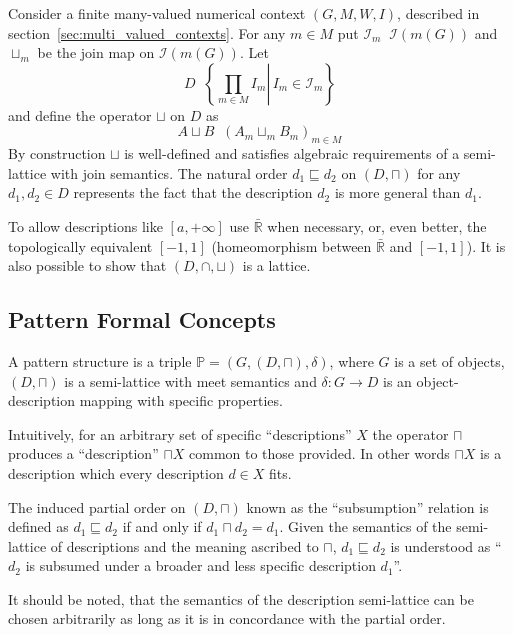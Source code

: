 \documentclass[a4paper]{article}
\newcommand{\obj}[1]{{\left\{ #1 \right \}}}
\newcommand{\clo}[1]{{\left [ #1 \right ]}}
\newcommand{\brac}[1]{{\left ( #1 \right )}}
\newcommand{\induc}[1]{{\left . #1 \right \vert}}
\newcommand{\Real}{\mathbb{R}}
\newcommand{\Ical}{\mathcal{I}}
\newcommand{\Pat}{\mathbb{P}}
\newcommand{\defn}{\mathop{\overset{\Delta}{=}}\nolimits}
\begin{document}
Consider a finite many-valued numerical context $\brac{G,M,W,I}$, described in section~\ref{sec:multi_valued_contexts}. For any $m\in M$ put $\Ical_m \defn \Ical\brac{m(G)}$ and $\sqcup_m$ be the join map on $\Ical\brac{m(G)}$. Let \[D\defn \obj{\induc{\prod_{m\in M} I_m}\, I_m\in \mathcal{I}_m}\] and define the operator $\sqcup$ on $D$ as \[ A\sqcup B \defn \brac{A_m\sqcup_m B_m}_{m\in M}\] By construction $\sqcup$ is well-defined and satisfies algebraic requirements of a semi-lattice with join semantics. The natural order $d_1\sqsubseteq d_2$ on $(D,\sqcap)$ for any $d_1, d_2\in D$ represents the fact that the description $d_2$ is more general than $d_1$.

To allow descriptions like $\clo{a, +\infty}$ use $\bar{\Real}$ when necessary, or, even better, the topologically equivalent $\clo{-1,1}$ (homeomorphism between $\bar{\Real}$ and $\clo{-1,1}$). It is also possible to show that $(D,\cap,\sqcup)$ is a lattice.



\subsection{Pattern Formal Concepts} %
\label{sub:pattern_formal_concepts}

A pattern structure is a triple $\Pat = \brac{G,(D,\sqcap), \delta}$, where $G$ is a set of objects, $(D, \sqcap)$ is a semi-lattice with meet semantics and $\delta: G\to D$ is an object-description mapping with specific properties.

Intuitively, for an arbitrary set of specific ``descriptions'' $X$ the operator $\sqcap$ produces a ``description'' $\sqcap X$ common to those provided. In other words $\sqcap X$ is a description which every description $d\in X$ fits.

The induced partial order on $(D,\sqcap)$ known as the ``subsumption'' relation is defined as $d_1\sqsubseteq d_2$ if and only if $d_1\sqcap d_2 = d_1$. Given the semantics of the semi-lattice of descriptions and the meaning ascribed to $\sqcap$, $d_1\sqsubseteq d_2$ is understood as ``$d_2$ is subsumed under a broader and less specific description $d_1$''.

It should be noted, that the semantics of the description semi-lattice can be chosen arbitrarily as long as it is in concordance with the partial order.
\end{document}
